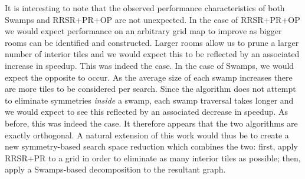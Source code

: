 It is interesting to note that the observed performance characteristics of both Swamps and RRSR+PR+OP
are not unexpected.
In the case of RRSR+PR+OP we would expect performance on an arbitrary grid map to improve as bigger
rooms can be identified and constructed. 
Larger rooms allow us to prune a larger number of interior tiles and we would expect this to be reflected
by an associated increase in speedup. This was indeed the case.
In the case of Swamps, we would expect the opposite to occur. As the average size of each swamp increases
there are more tiles to be considered per search. Since the algorithm does not attempt to eliminate symmetries
\emph{inside} a swamp, each swamp traversal takes longer and we would expect to see this reflected
by an associated decrease in speedup. As before, this was indeed the case.
It therefore appears that the two algorithms are exactly orthogonal.
A natural extension of this work would thus be to create a new symmetry-based search space reduction
which combines the two: first, apply RRSR+PR to a grid in order to eliminate as many interior tiles 
as possible; then, apply a Swamps-based decomposition to the resultant graph.

